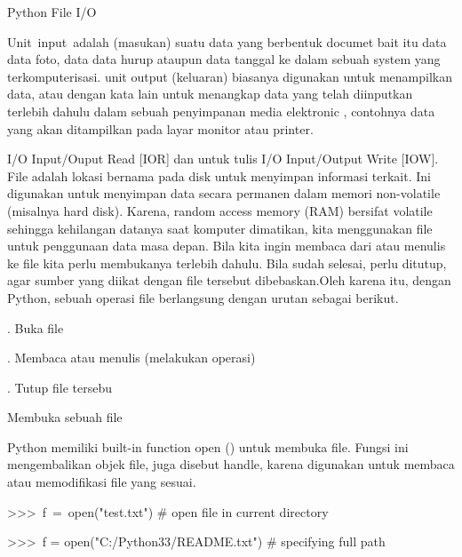 
\sloppy
\begin{center}{\fontsize{14pt}{14pt}\selectfont Python File I/O \\}\end{center} \par
Unit~input~adalah (masukan) suatu  data yang berbentuk documet bait itu data data foto, data data hurup ataupun data tanggal ke dalam sebuah system yang  terkomputerisasi.  unit output (keluaran) biasanya digunakan untuk menampilkan data, atau dengan kata lain untuk menangkap data yang telah diinputkan terlebih dahulu dalam sebuah penyimpanan media elektronic , contohnya data yang akan ditampilkan pada layar monitor atau printer. \par
I/O Input/Ouput Read [IOR] dan untuk tulis I/O Input/Output Write [IOW]. File adalah lokasi bernama pada disk untuk menyimpan informasi terkait. Ini digunakan untuk menyimpan data secara permanen dalam memori non-volatile (misalnya hard disk). Karena, random access memory (RAM) bersifat volatile sehingga kehilangan datanya saat komputer dimatikan, kita menggunakan file untuk penggunaan data masa depan. Bila kita ingin membaca dari atau menulis ke file kita perlu membukanya terlebih dahulu. Bila sudah selesai, perlu ditutup, agar sumber yang diikat dengan file tersebut dibebaskan.Oleh karena itu, dengan Python, sebuah operasi file berlangsung dengan urutan sebagai berikut. \par
\vspace{12pt}
. \hspace*{0.5in} Buka file \par
{}. \hspace*{0.5in} Membaca atau menulis (melakukan operasi) \par
{}. \hspace*{0.5in} Tutup file tersebu \par
\vspace{12pt}
\vspace{12pt}
\vspace{12pt}
\noindent 
Membuka sebuah file \par
\noindent 
Python memiliki built-in function open () untuk membuka file. Fungsi ini mengembalikan objek file, juga disebut handle, karena digunakan untuk membaca atau memodifikasi file yang sesuai. \par
\vspace{12pt}
\noindent 
>>>~f~=~open("test.txt")     $  \#  $ open file in current directory \par
\noindent 
>>>~f = open("C:/Python33/README.txt")   $  \#  $ specifying full path \par
